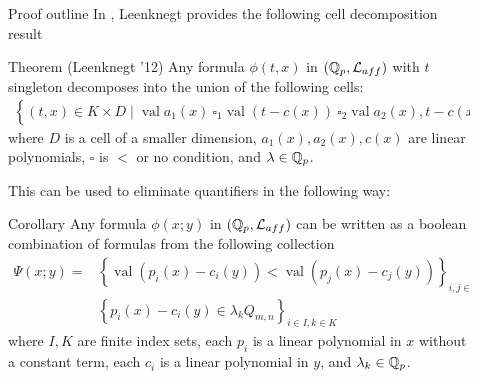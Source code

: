 \documentclass[final]{beamer}
\newcommand{\curly}[1]{\left\{ #1 \right\}}
\DeclareMathOperator{\vval}{val}
\newlength{\sepwid}
\newlength{\onecolwid}
\begin{document}
\begin{frame}[t]
\begin{columns}[t]
\begin{column}{\onecolwid}
\end{column} %

\begin{column}{\sepwid}\end{column} %

\begin{column}{\onecolwid}
     
    \begin{block}{Proof outline}
        In \cite{reduct}, Leenknegt provides the following cell decomposition result
        \begin{alertblock} {Theorem (Leenknegt '12)}
            Any formula $\phi(t, x)$ in $(\mathbb{Q}_p, \mathcal L_{aff})$ with $t$ singleton decomposes into the union of the following cells:
            \begin{align*}
                    \curly{(t, x) \in K \times D \mid \vval a_1(x) \ \square_1 \vval (t - c(x)) \ \square_2 \vval a_2(x), t - c(x) \in \lambda Q_{m,n} }
            \end{align*}
            where $D$ is a cell of a smaller dimension,
            $a_1(x), a_2(x), c(x)$ are linear polynomials,
            $\square$ is $<$ or no condition, and
            $\lambda  \in\mathbb{Q}_p$.    
        \end{alertblock}
        This can be used to eliminate quantifiers in the following way:
        \begin{alertblock} {Corollary}%
            Any formula $\phi(x; y)$ in $(\mathbb{Q}_p, \mathcal L_{aff})$ can be written as a boolean combination of formulas from the following collection
            \begin{align*}
                    \Psi(x; y) = &\curly{\vval (p_i(x) - c_i(y)) < \vval (p_j(x) - c_j(y))}_{i, j \in I} \cup \\
                    &\curly{p_i(x) - c_i(y) \in \lambda_k Q_{m,n}}_{i \in I , k \in K}
            \end{align*}
            where $I, K$ are finite index sets,
            each $p_i$ is a linear polynomial in $x$ without a constant term,
            each $c_i$ is a linear polynomial in $y$, and
            $\lambda_k \in \mathbb{Q}_p$.
        \end{alertblock}


\end{block}
\end{column}
\end{columns}
\end{frame}
\end{document}
